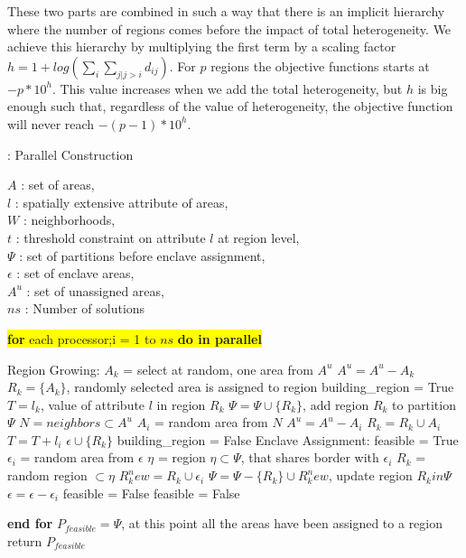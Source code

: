 \documentclass[conference]{IEEEtran}
\begin{document}
These two parts are combined in such a way that there is an implicit
hierarchy where the number of regions comes before the impact of total
heterogeneity. We achieve this hierarchy by multiplying the first term by a
scaling factor $h = 1 + log(\sum_i \sum_{j|j>i} d_{ij})$. For $p$ regions the
objective functions starts at $−p\ast10^h$. This value increases when we add the
total heterogeneity, but $h$ is big enough such that, regardless of the value of
heterogeneity, the objective function will never reach $-(p-1) \ast 10^h$.

\begin{algorithm}
\renewcommand{\thealgorithm}{}
\scriptsize
\caption{: Parallel Construction~\cite{r1}}
$A$ : set of areas,\\
$l$ : spatially extensive attribute of areas,\\
$W$ : neighborhoods,\\
$t$ : threshold constraint on attribute $l$ at region level,\\
$\Psi$ : set of partitions before enclave assignment,\\
$\epsilon$ : set of enclave areas,\\
$A^u$ : set of unassigned areas,\\
$ns$ : Number of solutions\\
\begin{algorithmic}
\vbox{\colorbox{yellow}{\vbox{\STATE \textbf{for} each processor;i = 1 to $ns$ \textbf{do in parallel}}}} 
\begin{ALC@g}
	\STATE Region Growing:
		\STATE $A_k$ = select at random, one area from $A^u$
		\STATE $A^u = A^u - A_k$
		\STATE $R_k = \{A_k\}$, randomly selected area is assigned to region
		\STATE building\_region = True
		\STATE $T = l_k$, value of attribute $l$ in region $R_k$
				\STATE $\Psi = \Psi \cup \{R_k\}$, add region $R_k$ to partition $\Psi$
			\ELSE
				\STATE $N = neighbors \subset A^u$%
					\STATE $A_i$ = random area from $N$
					\STATE $A^u = A^u - A_i$
					\STATE $R_k = R_k \cup A_i$
					\STATE $T = T + l_i$
				\ELSE
					\STATE $\epsilon \cup \{R_k\}$
					\STATE building\_region = False
				\ENDIF
			\ENDIF
		\ENDWHILE
	\ENDWHILE
	\STATE Enclave Assignment:
		\STATE feasible = True
			\STATE $\epsilon_i$ = random area from $\epsilon$
			\STATE $\eta$ = region $\eta \subset \Psi $, that shares border with $\epsilon_i$
				\STATE $R_k$ = random region $\subset \eta$
				\STATE $R_k^new = R_k \cup \epsilon_i$
				\STATE $\Psi = \Psi - \{R_k\} \cup R_k^new$, update region $R_k in \Psi$
				\STATE $\epsilon = \epsilon - \epsilon_i$
			\ELSE
				\STATE feasible = False
			\ENDIF
		\ENDWHILE
	\ELSE
		\STATE feasible = False
	\ENDIF
\end{ALC@g}
\STATE \textbf{end for}
\STATE $P_{feasible} = \Psi$, at this point all the areas have been assigned to a region
\STATE return $P_{feasible}$
\end{algorithmic}
\end{algorithm}
\end{document}

